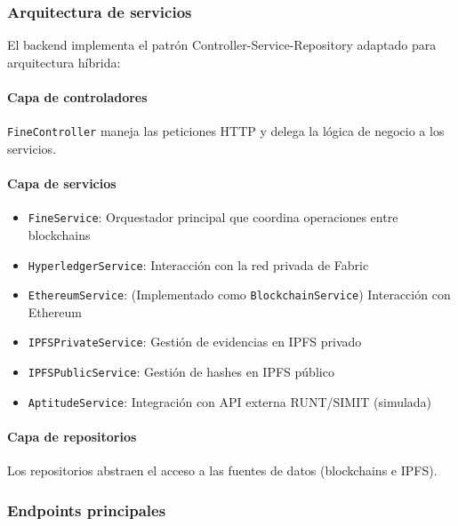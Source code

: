 \subsubsection{Arquitectura de servicios}

El backend implementa el patrón Controller-Service-Repository adaptado para arquitectura híbrida:

\paragraph{Capa de controladores}
\texttt{FineController} maneja las peticiones HTTP y delega la lógica de negocio a los servicios.

\paragraph{Capa de servicios}
\begin{itemize}
    \item \texttt{FineService}: Orquestador principal que coordina operaciones entre blockchains
    \item \texttt{HyperledgerService}: Interacción con la red privada de Fabric
    \item \texttt{EthereumService}: (Implementado como \texttt{BlockchainService}) Interacción con Ethereum
    \item \texttt{IPFSPrivateService}: Gestión de evidencias en IPFS privado
    \item \texttt{IPFSPublicService}: Gestión de hashes en IPFS público
    \item \texttt{AptitudeService}: Integración con API externa RUNT/SIMIT (simulada)
\end{itemize}

\paragraph{Capa de repositorios}
Los repositorios abstraen el acceso a las fuentes de datos (blockchains e IPFS).

\subsubsection{Endpoints principales}

